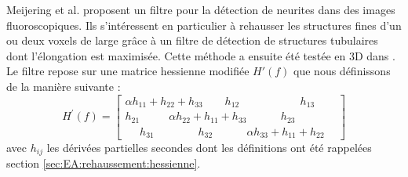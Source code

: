 Meijering et al. \cite{Meijering2004_neurite_vesselness} proposent un filtre pour la détection de neurites dans des images fluoroscopiques. Ils s'intéressent en particulier à rehausser les structures fines d'un ou deux voxels de large grâce à un filtre de détection de structures tubulaires dont l'élongation est maximisée. Cette méthode a ensuite été testée en 3D dans \cite{Obara2012_phase}. Le filtre repose sur une matrice hessienne modifiée $H'(f)$ que nous définissons de la manière suivante :
\begin{equation}
    H^{'}(f)=
    \begin{bmatrix}
    \alpha h_{11}+ h_{22} +   h_{33} ~~~~~~~~~ h_{12} ~~~~~~~~~~~~~~~~~~~~~~~~~ h_{13} ~~~~~~~~ \\
    h_{21} ~~~~~~~~~~~~ \alpha h_{22} + h_{11} +  h_{33} ~~~~~~~~~~~~~~ h_{23} \\
    ~~~~~~ h_{31} ~~~~~~~~~~~~~~~~~~ h_{32} ~~~~~~~~~~~~~~ \alpha h_{33} + h_{11} +  h_{22}
    \end{bmatrix}
\end{equation}
avec $h_{ij}$ les dérivées partielles secondes dont les définitions ont été rappelées section \ref{sec:EA:rehaussement:hessienne}.


